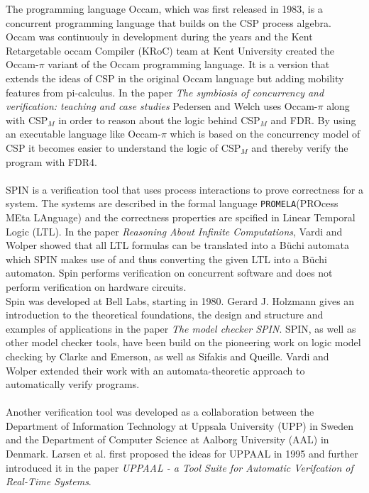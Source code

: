 \documentclass[a4paper]{report}
\newcommand{\cspm}{CSP$_M$ }
\begin{document}
The programming language Occam\cite{Occam1995}, which was first released in 1983, is a concurrent programming language that builds on the CSP process algebra. Occam was continuouly in development during the years and the Kent Retargetable occam Compiler (KRoC) team at Kent University created the Occam-$\pi$\cite{UniveristyofKent} variant of the Occam programming language. It is a version that extends the ideas of CSP in the original Occam language but adding mobility features from pi-calculus. In the paper \textit{The symbiosis of concurrency and verification: teaching and case studies}\cite{Pedersen2018} Pedersen and Welch uses Occam-$\pi$ along with \cspm in order to reason about the logic behind \cspm and FDR. By using an executable language like Occam-$\pi$ which is based on the concurrency model of CSP it becomes easier to understand the logic of \cspm and thereby verify the program with FDR4.\\\\
SPIN\cite{spin} is a verification tool that uses process interactions to prove correctness for a system. The systems are described in the formal language \texttt{PROMELA}(PROcess MEta LAnguage)\cite{Holzmann1991} and the correctness properties are spcified in Linear Temporal Logic (LTL)\cite{Pnueli1977}. In the paper \textit{Reasoning About Infinite Computations}\cite{Vardi1994}, Vardi and Wolper showed that all LTL formulas can be translated into a B\"uchi automata which SPIN makes use of and thus converting the given LTL into a B\"uchi automaton. Spin performs verification on concurrent software and does not perform verification on hardware circuits. \\
Spin was developed at Bell Labs, starting in 1980. Gerard J. Holzmann gives an introduction to the theoretical foundations, the design and structure and examples of applications in the paper \textit{The model checker SPIN}\cite{Holzmann1997}. SPIN, as well as other model checker tools, have been build on the pioneering work on logic model checking by Clarke and Emerson\cite{Clarke1981}, as well as Sifakis and Queille\cite{Queille1982}.  Vardi and Wolper extended their work with an automata-theoretic approach to automatically verify programs\cite{Vardi1986}.\\\\
Another verification tool was developed as a collaboration between the Department of Information Technology at Uppsala University (UPP) in Sweden and the Department of Computer Science at Aalborg University (AAL) in Denmark. Larsen et al. first proposed the ideas for UPPAAL\cite{Larsen1995} in 1995 and further introduced it in the paper \textit{UPPAAL - a Tool Suite for Automatic Verifcation of Real-Time Systems}\cite{Bengtsson1995}.
\end{document}
